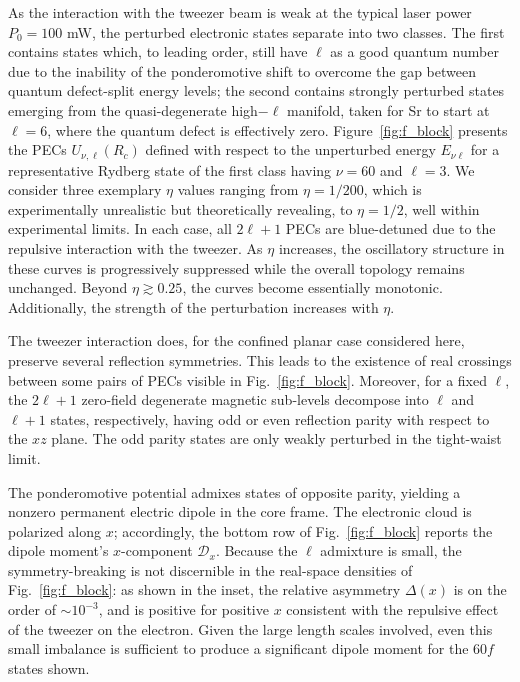 \documentclass[aps,prl,groupedaddress,superscriptaddress,twocolumn,10pt,longbibliography]{revtex4-2}
\begin{document}
As the interaction with the tweezer beam is weak at the typical laser power $P_0\!=\!100$ mW, the perturbed electronic states separate into two classes.
The first contains states which, to leading order, still have $\ell$ as a good quantum number due to the inability of the ponderomotive shift to overcome the gap between quantum defect-split energy levels; the second contains strongly perturbed states emerging from the quasi-degenerate high$-\ell$ manifold, taken for Sr to start at $\ell{=}6$, where the quantum defect is effectively zero. Figure~\ref{fig:f_block} presents the PECs $U_{\nu, \ell}(R_c)$ defined with respect to the unperturbed energy $E_{\nu \ell}$ for a representative Rydberg state of the first class having $\nu \!=\!60$ and $\ell\!=\!3$.
 We consider three exemplary $\eta$ values ranging from $\eta=1/200$, which is experimentally unrealistic but theoretically revealing, to $\eta = 1/2$,  well within experimental limits.
In each case, all $2\ell+1$ PECs are blue-detuned due to the repulsive interaction with the tweezer. As $\eta$ increases, the oscillatory structure in these curves is progressively suppressed while the overall topology remains unchanged. Beyond $\eta\gtrsim 0.25$, the curves become essentially monotonic.
Additionally, the strength of the perturbation increases with $\eta$.

The tweezer interaction does, for the confined planar case considered here, preserve several reflection symmetries.
This leads to the existence of real crossings between some pairs of PECs visible in Fig.~\ref{fig:f_block}.
Moreover, for a fixed $\ell$,  the $2\ell+1$ zero-field degenerate magnetic sub-levels decompose into $\ell$ and $\ell+1$ states, respectively, having odd or even reflection parity with respect to the $xz$ plane.
The odd parity states are only weakly perturbed in the tight-waist limit.

The ponderomotive potential admixes states of opposite parity, yielding a nonzero permanent electric dipole in the core frame.
 The electronic cloud is polarized along $x$;
accordingly, the bottom row of Fig.~\ref{fig:f_block} reports the dipole moment's $x$-component $ \mathcal{D}_x$.
Because the $\ell$ admixture is small, the symmetry-breaking is not discernible in the real-space densities of Fig.~\ref{fig:f_block}: as shown in the inset, the relative asymmetry $\Delta(x)$ is on the order of $\sim 10^{-3}$, and is positive for positive $x$ consistent with the repulsive effect of the tweezer on the electron.
Given the large length scales involved, even this small imbalance is sufficient to produce a significant dipole moment for the $60f$ states shown.
\end{document}
